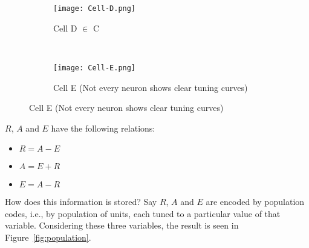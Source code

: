 \documentclass[main]{subfiles}
\begin{document}
\begin{figure}[H]
	\centering
	\begin{subfigure}[b]{0.3\textwidth}
		\centering
		\texttt{[image: Cell-D.png]}
		\caption{Cell D $\in$ C}
	\end{subfigure}%
	~
	\begin{subfigure}[b]{0.3\textwidth}
		\centering
		\texttt{[image: Cell-E.png]}
		\caption{Cell E (Not every neuron shows clear tuning curves)}
	\end{subfigure}
\end{figure}

$R$, $A$ and $E$ have the following relations:
\begin{itemize}
\item $R = A - E$
\item $A = E + R$
\item $E = A - R$
\end{itemize}

How does this information is stored? Say $R$, $A$ and $E$ are encoded by population codes, i.e., by population of units, each tuned to a particular value of that variable. Considering these three variables, the result is seen in Figure~\ref{fig:population}.
\end{document}
